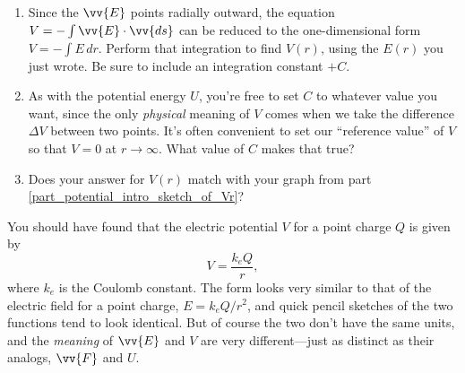 \begin{enumerate}[wide, label=(\emph{\alph*})]
\item Since the $\vv{E}$ points radially outward, the equation $V=-\int{\vv{E} \cdot \vv{ds}}$ can be reduced to 
the one-dimensional form $V=-\int{E \, dr}$.  Perform that integration to find $V(r)$, using the $E(r)$ you just wrote. Be sure to include an integration constant $+C$.
\answerspace{1.2in}

\item As with the potential energy $U$, you're free to set $C$ to whatever value you want, since the only \textit{physical} meaning of $V$ comes when we take the difference $\Delta V$ between two points.  It's often convenient to set our ``reference value'' of $V$ so that $V=0$ at $r \rightarrow \infty$.  What value of $C$ makes that true?
\answerspace{0.5in}

\item Does your answer for $V(r)$ match with your graph from part \ref{part_potential_intro_sketch_of_Vr}?
\answerspace{0.5in}



\end{enumerate}

You should have found that the electric potential $V$ for a point charge $Q$ is given by
$$V=\frac{k_eQ}{r},$$
where $k_e$ is the Coulomb constant.  The form looks very similar to that of the electric field for a point charge, $E={k_eQ}/{r^2}$, and quick pencil sketches of the two functions tend to look identical.  But of course the two don't have the same units, and the \textit{meaning} of $\vv{E}$ and $V$ are very different---just as distinct as their analogs, $\vv{F}$ and $U$.  
  



